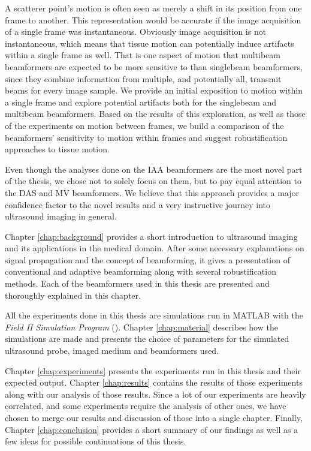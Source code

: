 A scatterer point's motion is often seen as merely a shift in its position from one frame to another. This representation would be accurate if the image acquisition of a single frame was instantaneous.
Obviously image acquisition is not instantaneous, which means that tissue motion can potentially induce artifacts within a single frame as well.
That is one aspect of motion that multibeam beamformers are expected to be more sensitive to than singlebeam beamformers, since they combine information from multiple, and potentially all, transmit beams for every image sample.
We provide an initial exposition to motion within a single frame and explore potential artifacts both for the singlebeam and multibeam beamformers.
Based on the results of this exploration, as well as those of the experiments on motion between frames, we build a comparison of the beamformers' sensitivity to motion within frames and suggest robustification approaches to tissue motion.

Even though the analyses done on the IAA beamformers are the most novel part of the thesis, we chose not to solely focus on them, but to pay equal attention to the DAS and MV beamformers. We believe that this approach provides a major confidence factor to the novel results and a very instructive journey into ultrasound imaging in general.

Chapter \ref{chap:background} provides a short introduction to ultrasound imaging and its applications in the medical domain.
After some necessary explanations on signal propagation and the concept of beamforming, it gives a presentation of conventional and adaptive beamforming along with several robustification methods.
Each of the beamformers used in this thesis are presented and thoroughly explained in this chapter.

All the experiments done in this thesis are simulations run in MATLAB with the \textit{Field II Simulation Program} (\cite{Field_II,Field_II_ext}).
Chapter \ref{chap:material} describes how the simulations are made and presents the choice of parameters for the simulated ultrasound probe, imaged medium and beamformers used.

Chapter \ref{chap:experiments} presents the experiments run in this thesis and their expected output.
Chapter \ref{chap:results} contains the results of those experiments along with our analysis of those results.
Since a lot of our experiments are heavily correlated, and some experiments require the analysis of other ones, we have chosen to merge our results and discussion of those into a single chapter.
Finally, Chapter \ref{chap:conclusion} provides a short summary of our findings as well as a few ideas for possible continuations of this thesis.

